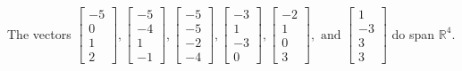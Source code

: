 \begin{exercise}
\begin{exerciseStatement}
  \end{exerciseStatement}
  \begin{exerciseAnswer}
   The vectors \(\left[\begin{array}{r}
-5 \\
0 \\
1 \\
2
\end{array}\right] , \left[\begin{array}{r}
-5 \\
-4 \\
1 \\
-1
\end{array}\right] , \left[\begin{array}{r}
-5 \\
-5 \\
-2 \\
-4
\end{array}\right] , \left[\begin{array}{r}
-3 \\
1 \\
-3 \\
0
\end{array}\right] , \left[\begin{array}{r}
-2 \\
1 \\
0 \\
3
\end{array}\right] , \text{ and } \left[\begin{array}{r}
1 \\
-3 \\
3 \\
3
\end{array}\right]\) 
  	 do  
	span \(\mathbb{R}^4\).
  


  \end{exerciseAnswer}
\end{exercise}